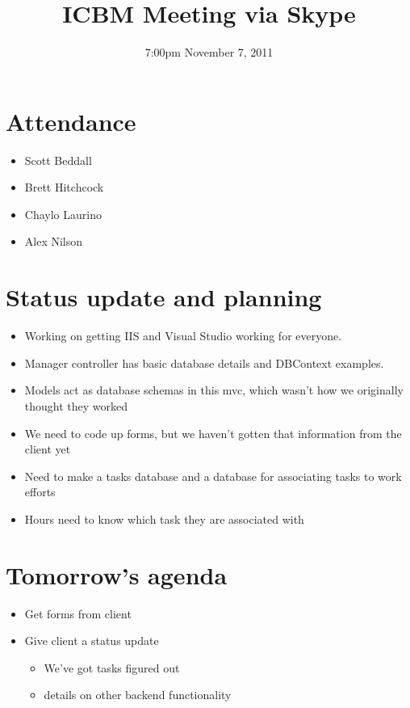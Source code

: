 \documentclass{article}
\begin{document}
\title{ICBM Meeting via Skype}
\date{7:00pm November 7, 2011}
\maketitle

\section{Attendance}
\begin{itemize}
\item Scott Beddall
\item Brett Hitchcock
\item Chaylo Laurino
\item Alex Nilson
\end{itemize}

\section{Status update and planning}
\begin{itemize}
\item Working on getting IIS and Visual Studio working for everyone.
\item Manager controller has basic database details and DBContext examples.
\item Models act as database schemas in this mvc, which wasn't how we originally thought they worked
\item We need to code up forms, but we haven't gotten that information from the client yet
\item Need to make a tasks database and a database for associating tasks to work efforts
\item Hours need to know which task they are associated with
\end{itemize}

\section{Tomorrow's agenda}
\begin{itemize}
\item Get forms from client
\item Give client a status update
	\begin{itemize}
	\item We've got tasks figured out
	\item details on other backend functionality
	\end{itemize}
\end{itemize}
\end{document}
